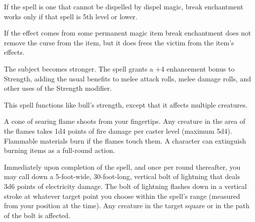\begin{multicols}{2}
\begin{small}
\smallskip\noindent If the spell is one that cannot be dispelled by dispel magic, break enchantment works only if that spell is 5th level or lower. 

\smallskip\noindent If the effect comes from some permanent magic item break enchantment does not remove the curse from the item, but it does frees the victim from the item's effects. 

\noindent The subject becomes stronger. The spell grants a +4 enhancement bonus to Strength, adding the usual benefits to melee attack rolls, melee damage rolls, and other uses of the Strength modifier.


\noindent This spell functions like bull's strength, except that it affects multiple creatures.

\noindent A cone of searing flame shoots from your fingertips. Any creature in the area of the flames takes 1d4 points of fire damage per caster level (maximum 5d4). Flammable materials burn if the flames touch them. A character can extinguish burning items as a full-round action.

\noindent Immediately upon completion of the spell, and once per round thereafter, you may call down a 5-foot-wide, 30-foot-long, vertical bolt of lightning that deals 3d6 points of electricity damage. The bolt of lightning flashes down in a vertical stroke at whatever target point you choose within the spell's range (measured from your position at the time). Any creature in the target square or in the path of the bolt is affected.


\end{small}
\end{multicols}

